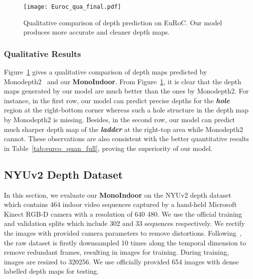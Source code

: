 \begin{figure}[!t]
\begin{center}
\texttt{[image: Euroc\_qua\_final.pdf]}
\end{center}
\caption{Qualitative comparison of depth prediction on EuRoC. Our model produces more accurate and cleaner depth maps.}
\label{fig:euroc_qua_full}
\end{figure}

\subsubsection{Qualitative Results}
Figure~\ref{fig:euroc_qua_full} gives a qualitative comparison of depth maps predicted by Monodepth2~\cite{godard2019digging} and our \textbf{MonoIndoor}. From Figure~\ref{fig:euroc_qua_full}, it is clear that the depth maps generated by our model are much better than the ones by Monodepth2. For instance, in the first row, our model can predict precise depths for the \textbf{\textit{hole}} region at the right-bottom corner whereas such a hole structure in the depth map by Monodepth2 is missing. Besides, in the second row, our model can predict much sharper depth map of the \textit{\textbf{ladder}} at the right-top area while Monodepth2 cannot. These observations are also consistent with the better quantitative results in Table~\ref{tab:eurco_quan_full}, proving the superiority of our model. 





\subsection{NYUv2 Depth Dataset}
In this section, we evaluate our \textbf{MonoIndoor} on the NYUv2 depth dataset~\cite{Silberman:ECCV12} which contains 464 indoor video sequences captured by a hand-held Microsoft Kinect RGB-D camera with a resolution of 640 480. We use the official training and validation splits which include 302 and 33 sequences respectively. We rectify the images with provided camera parameters to remove distortions. Following~\cite{zhao2020towards, bian2020unsupervised}, the raw dataset is firstly downsampled 10 times along the temporal dimension to remove redundant frames, resulting in  images for training. During training, images are resized to 320256. We use officially provided 654 images with dense labelled depth maps for testing.

